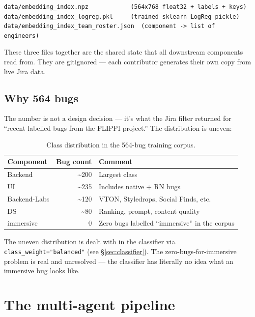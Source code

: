 \documentclass[11pt,a4paper]{article}
\begin{document}
\begin{lstlisting}
data/embedding_index.npz            (564x768 float32 + labels + keys)
data/embedding_index_logreg.pkl     (trained sklearn LogReg pickle)
data/embedding_index_team_roster.json  (component -> list of engineers)
\end{lstlisting}

These three files together are the shared state that all downstream
components read from. They are gitignored --- each contributor generates
their own copy from live Jira data.

\subsection{Why 564 bugs}

The number is not a design decision --- it's what the Jira filter returned
for ``recent labelled bugs from the FLIPPI project.'' The distribution is
uneven:

\begin{table}[h]
\centering
\small
\begin{tabular}{lrl}
\toprule
\textbf{Component} & \textbf{Bug count} & \textbf{Comment} \\
\midrule
Backend        & \textasciitilde 200 & Largest class \\
UI             & \textasciitilde 235 & Includes native + RN bugs \\
Backend-Labs   & \textasciitilde 120 & VTON, Styledrops, Social Finds, etc. \\
DS             & \textasciitilde 80  & Ranking, prompt, content quality \\
immersive      & 0                   & Zero bugs labelled ``immersive'' in the corpus \\
\bottomrule
\end{tabular}
\caption{Class distribution in the 564-bug training corpus.}
\end{table}

The uneven distribution is dealt with in the classifier via
\texttt{class\_weight="balanced"} (see \S\ref{sec:classifier}). The
zero-bugs-for-immersive problem is real and unresolved --- the classifier
has literally no idea what an immersive bug looks like.

\newpage

\section{The multi-agent pipeline}\label{sec:pipeline}
\end{document}
